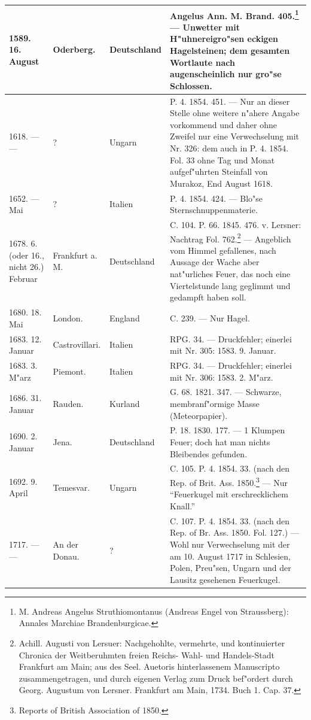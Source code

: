 \documentclass[a4paper, 8pt, oneside, polutonikogreek, german]{article}
\begin{document}
\begin{center}
\begin{longtable}{| p{20mm} | p{25mm} | p{20mm} | p{55mm} |}
        1589. 16. August & Oderberg. & Deutschland & Angelus Ann. M. Brand. 405.\footnote{M. Andreas Angelus Struthiomontanus (Andreas Engel von Straussberg): Annales Marchiae Brandenburgicae.} --- Unwetter mit H"uhnereigro"sen eckigen Hagelsteinen; dem gesamten Wortlaute nach augenscheinlich nur gro"se Schlossen. \\ \hline
        1618. --- --- & ? & Ungarn & P. 4. 1854. 451. --- Nur an dieser Stelle ohne weitere n"ahere Angabe vorkommend und daher ohne Zweifel nur eine Verwechselung mit Nr. 326: dem auch in P. 4. 1854. Fol. 33 ohne Tag und Monat aufgef"uhrten Steinfall von Murakoz, End August 1618. \\ \hline
        1652. --- Mai & ? & Italien & P. 4. 1854. 424. --- Blo"se Sternschnuppenmaterie. \\ \hline
        1678. 6. (oder 16., nicht 26.) Februar & Frankfurt a. M. & Deutschland & C. 104. P. 66. 1845. 476. v. Lersner: Nachtrag Fol. 762.\footnote{Achill. Augusti von Lersuer: Nachgehohlte, vermehrte, und kontinuierter Chronica der Weitberuhmten freien Reichs- Wahl- und Handels-Stadt Frankfurt am Main; aus des Seel. Auetoris hinterlassenem Manuscripto zusammengetragen, und durch eigenen Verlag zum Druck bef"ordert durch Georg. Augustum von Lersner. Frankfurt am Main, 1734. Buch 1. Cap. 37.} --- Angeblich vom Himmel gefallenes, nach Aussage der Wache aber nat"urliches Feuer, das noch eine Viertelstunde lang geglimmt und gedampft haben soll. \\ \hline
        1680. 18. Mai & London. & England & C. 239. --- Nur Hagel. \\ \hline
        1683. 12. Januar & Castrovillari. & Italien & RPG. 34. --- Druckfehler; einerlei mit Nr. 305: 1583. 9. Januar. \\ \hline
        1683. 3. M"arz & Piemont. & Italien & RPG. 34. --- Druckfehler; einerlei mit Nr. 306: 1583. 2. M"arz. \\ \hline
        1686. 31. Januar & Rauden. & Kurland & G. 68. 1821. 347. --- Schwarze, membranf"ormige Masse (Meteorpapier). \\ \hline
        1690. 2. Januar & Jena. & Deutschland & P. 18. 1830. 177. --- 1 Klumpen Feuer; doch hat man nichts Bleibendes gefunden. \\ \hline
        1692. 9. April & Temesvar. & Ungarn & C. 105. P. 4. 1854. 33. (nach den Rep. of Brit. Ass. 1850.\footnote{Reports of British Association of 1850.} --- Nur "`Feuerkugel mit erschrecklichem Knall."' \\ \hline
        1717. --- --- & An der Donau. & ? & C. 107. P. 4. 1854. 33. (nach den Rep. of Br. Ass. 1850. Fol. 127.) --- Wohl nur Verwechselung mit der am 10. August 1717 in Schlesien, Polen, Preu"sen, Ungarn und der Lausitz gesehenen Feuerkugel. \\ \hline

\end{longtable}
\end{center}
\end{document}
